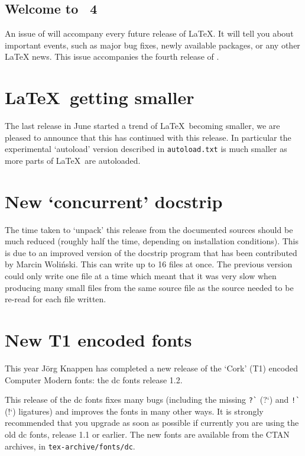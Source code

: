 \documentclass{ltnews}
\providecommand\file[1]{\texttt{#1}}
\begin{document}
\maketitle

\subsection{Welcome to \LaTeXNews~4}

An issue of \emph{\LaTeXNews} will accompany every future release of
\LaTeX.  It will tell you about important events, such as major bug
fixes, newly available packages, or any other \LaTeX{} news.
This issue accompanies the fourth release of \LaTeXe.


\section{\LaTeX\ getting smaller}

The last release in June started a trend of \LaTeX\ becoming
smaller, we are pleased to announce that this has continued with this
release. In particular the experimental `autoload' version described in
\file{autoload.txt} is much smaller as more parts of \LaTeX\ are
autoloaded.

\section{New `concurrent' docstrip}

The time taken to `unpack' this release from the documented sources
should be much reduced (roughly half the time, depending on
installation conditions). This is due to an improved version of the
docstrip program that has been contributed by Marcin Woli\'nski.
This can write up to 16 files at once. The
previous version could only write one file at a time which meant that
it was very slow when producing many small files from the same source
file as the source needed to be re-read for each file written.

\section{New T1 encoded fonts}

This year J\"org Knappen has completed a new release of the `Cork'
(T1) encoded Computer Modern fonts: the dc fonts release 1.2.

This release of the dc fonts fixes many bugs (including the missing
\verb|?`| (?`) and \verb|!`| (!`) ligatures) and improves the fonts in
many other ways. It is strongly recommended that you upgrade as soon as
possible if currently you are using the old dc fonts, release 1.1 or
earlier. The new fonts are available from the CTAN archives, in
\file{tex-archive/fonts/dc}.
\end{document}
